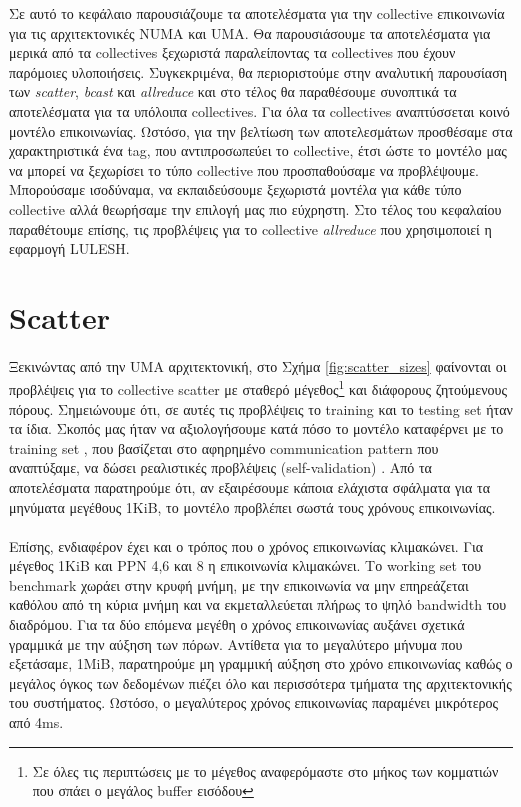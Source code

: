 Σε αυτό το κεφάλαιο παρουσιάζουμε τα αποτελέσματα για την collective επικοινωνία για τις αρχιτεκτονικές NUMA και UMA. Θα παρουσιάσουμε τα αποτελέσματα για μερικά από τα collectives ξεχωριστά παραλείποντας τα collectives που έχουν παρόμοιες υλοποιήσεις. Συγκεκριμένα, θα περιοριστούμε στην αναλυτική παρουσίαση των \textit{scatter}, \textit{bcast} και \textit{allreduce} και στο τέλος θα παραθέσουμε συνοπτικά τα αποτελέσματα για τα υπόλοιπα collectives.  Για όλα τα collectives αναπτύσσεται κοινό μοντέλο επικοινωνίας. Ωστόσο, για την βελτίωση των αποτελεσμάτων προσθέσαμε στα χαρακτηριστικά ένα tag, που αντιπροσωπεύει το collective, έτσι ώστε το μοντέλο μας να μπορεί να ξεχωρίσει το τύπο collective που προσπαθούσαμε να προβλέψουμε. Μπορούσαμε ισοδύναμα, να εκπαιδεύσουμε ξεχωριστά μοντέλα για κάθε τύπο collective αλλά θεωρήσαμε την επιλογή μας πιο εύχρηστη. Στο τέλος του κεφαλαίου παραθέτουμε επίσης, τις προβλέψεις για το collective \textit{allreduce} που χρησιμοποιεί η εφαρμογή LULESH.

\section{Scatter}
\paragraph{}
Ξεκινώντας από την UMA αρχιτεκτονική, στο Σχήμα \ref{fig:scatter_sizes} φαίνονται οι προβλέψεις για το collective scatter με σταθερό μέγεθος\footnote{Σε όλες τις περιπτώσεις με το μέγεθος αναφερόμαστε στο μήκος των κομματιών που σπάει ο μεγάλος buffer εισόδου} και διάφορους ζητούμενους πόρους. Σημειώνουμε ότι, σε αυτές τις προβλέψεις το training και το testing set ήταν τα ίδια. Σκοπός μας ήταν να αξιολογήσουμε κατά πόσο το μοντέλο καταφέρνει με το training set , που βασίζεται στο αφηρημένο communication pattern που αναπτύξαμε, να δώσει ρεαλιστικές προβλέψεις (self-validation) . Από τα αποτελέσματα παρατηρούμε ότι, αν εξαιρέσουμε κάποια ελάχιστα σφάλματα για τα μηνύματα μεγέθους 1KiB, το μοντέλο προβλέπει σωστά τους χρόνους επικοινωνίας. 
\paragraph{}
Επίσης, ενδιαφέρον έχει και ο τρόπος που ο χρόνος επικοινωνίας κλιμακώνει. Για μέγεθος 1KiB και PPN 4,6 και 8 η επικοινωνία κλιμακώνει. Το working set του benchmark χωράει στην κρυφή μνήμη, με την επικοινωνία να μην επηρεάζεται καθόλου από τη κύρια μνήμη και να εκμεταλλεύεται πλήρως το ψηλό bandwidth του διαδρόμου. Για τα δύο επόμενα μεγέθη ο χρόνος επικοινωνίας αυξάνει σχετικά γραμμικά με την αύξηση των πόρων.  Αντίθετα για το μεγαλύτερο μήνυμα που εξετάσαμε, 1MiB, παρατηρούμε μη γραμμική αύξηση στο χρόνο επικοινωνίας καθώς ο μεγάλος όγκος των δεδομένων πιέζει όλο και περισσότερα τμήματα της αρχιτεκτονικής του συστήματος. Ωστόσο, ο μεγαλύτερος χρόνος επικοινωνίας παραμένει μικρότερος από 4ms.
